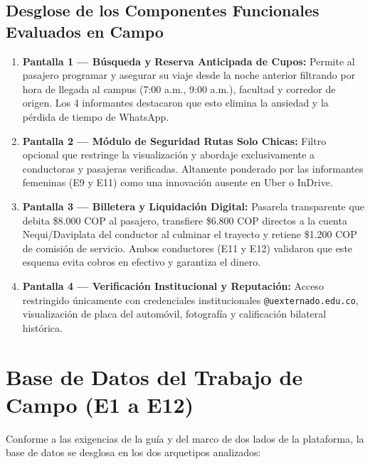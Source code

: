 \documentclass[11pt,a4paper]{article}
\begin{document}
\subsection{Desglose de los Componentes Funcionales Evaluados en Campo}
\begin{enumerate}[leftmargin=*]
    \item \textbf{Pantalla 1 --- B\'usqueda y Reserva Anticipada de Cupos:} Permite al pasajero programar y asegurar su viaje desde la noche anterior filtrando por hora de llegada al campus (7:00 a.m., 9:00 a.m.), facultad y corredor de origen. Los 4 informantes destacaron que esto elimina la ansiedad y la p\'erdida de tiempo de WhatsApp.
    \item \textbf{Pantalla 2 --- M\'odulo de Seguridad \guillemotleft Rutas Solo Chicas\guillemotright:} Filtro opcional que restringe la visualizaci\'on y abordaje exclusivamente a conductoras y pasajeras verificadas. Altamente ponderado por las informantes femeninas (E9 y E11) como una innovaci\'on ausente en Uber o InDrive.
    \item \textbf{Pantalla 3 --- Billetera y Liquidaci\'on Digital:} Pasarela transparente que debita \$8.000 COP al pasajero, transfiere \$6.800 COP directos a la cuenta Nequi/Daviplata del conductor al culminar el trayecto y retiene \$1.200 COP de comisi\'on de servicio. Ambos conductores (E11 y E12) validaron que este esquema evita cobros en efectivo y garantiza el dinero.
    \item \textbf{Pantalla 4 --- Verificaci\'on Institucional y Reputaci\'on:} Acceso restringido \'unicamente con credenciales institucionales \texttt{@uexternado.edu.co}, visualizaci\'on de placa del autom\'ovil, fotograf\'ia y calificaci\'on bilateral hist\'orica.
\end{enumerate}

\section{Base de Datos del Trabajo de Campo (E1 a E12)}

Conforme a las exigencias de la gu\'ia y del marco de dos lados de la plataforma, la base de datos se desglosa en los dos arquetipos analizados:
\end{document}
